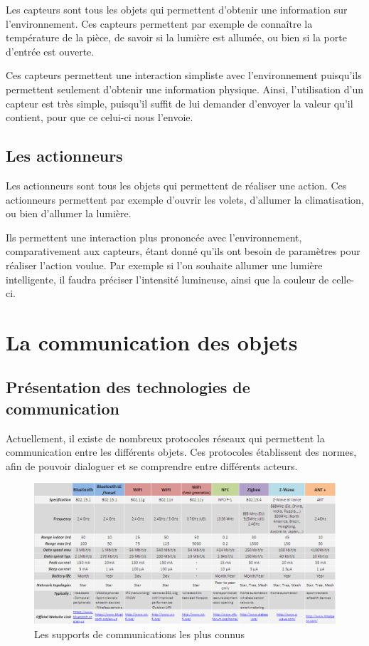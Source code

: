 Les capteurs sont tous les objets qui permettent d'obtenir une information sur l'environnement. Ces capteurs 
permettent par exemple de connaître la température de la pièce, de savoir si la lumière est allumée, ou 
bien si la porte d'entrée est ouverte.

Ces capteurs permettent une interaction simpliste avec l'environnement puisqu'ils permettent seulement 
d'obtenir une information physique. Ainsi, l'utilisation d'un capteur est très simple, puisqu'il suffit de 
lui demander d'envoyer la valeur qu'il contient, pour que ce celui-ci nous l'envoie.
	\subsection{Les actionneurs}
	
Les actionneurs sont tous les objets qui permettent de réaliser une action. Ces actionneurs permettent par 
exemple d'ouvrir les volets, d'allumer la climatisation, ou bien d'allumer la lumière.

Ils permettent une interaction plus prononcée avec l'environnement, comparativement aux capteurs, étant donné qu'ils ont besoin de paramètres pour réaliser l'action voulue. Par exemple si l'on souhaite allumer une lumière intelligente, il faudra préciser l'intensité lumineuse, ainsi que la couleur de celle-ci.

\section{La communication des objets}
	\subsection{Présentation des technologies de communication}
Actuellement, il existe de nombreux protocoles réseaux qui permettent la communication entre les différents objets. Ces protocoles établissent des normes, afin de pouvoir dialoguer et se comprendre entre différents acteurs.

\begin{figure}[!ht]
         \centering
         \includegraphics[width=1.05\textwidth]{img/tableau-total.png}
         \caption{Les supports de communications les plus connus}
         \label{supports}
\end{figure}

